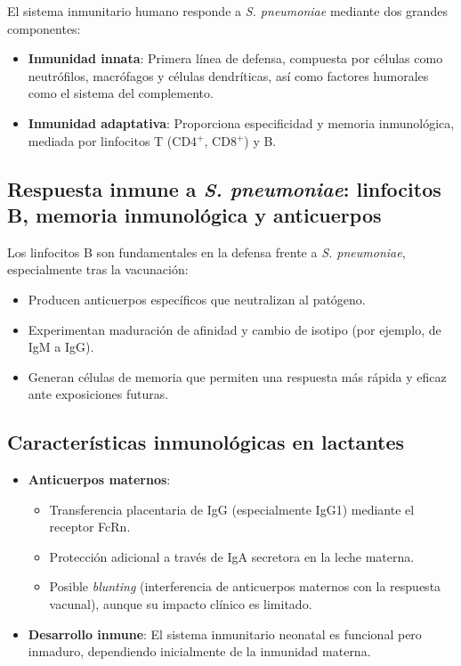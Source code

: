 El sistema inmunitario humano responde a \textit{S. pneumoniae} mediante dos grandes componentes:

\begin{itemize}
    \item \textbf{Inmunidad innata}: Primera línea de defensa, compuesta por células como neutrófilos, macrófagos y células dendríticas, así como factores humorales como el sistema del complemento.
    \item \textbf{Inmunidad adaptativa}: Proporciona especificidad y memoria inmunológica, mediada por linfocitos T (CD4$^+$, CD8$^+$) y B.
\end{itemize}

\subsection{Respuesta inmune a \textit{S. pneumoniae}: linfocitos B, memoria inmunológica y anticuerpos}

Los linfocitos B son fundamentales en la defensa frente a \textit{S. pneumoniae}, especialmente tras la vacunación:
\begin{itemize}
    \item Producen anticuerpos específicos que neutralizan al patógeno.
    \item Experimentan maduración de afinidad y cambio de isotipo (por ejemplo, de IgM a IgG).
    \item Generan células de memoria que permiten una respuesta más rápida y eficaz ante exposiciones futuras.
\end{itemize}

\subsection{Características inmunológicas en lactantes}
\begin{itemize}
    \item \textbf{Anticuerpos maternos}: 
    \begin{itemize}
        \item Transferencia placentaria de IgG (especialmente IgG1) mediante el receptor FcRn.
        \item Protección adicional a través de IgA secretora en la leche materna.
        \item Posible \textit{blunting} (interferencia de anticuerpos maternos con la respuesta vacunal), aunque su impacto clínico es limitado.\cite{AEP2023Blunting}
    \end{itemize}
    \item \textbf{Desarrollo inmune}: El sistema inmunitario neonatal es funcional pero inmaduro, dependiendo inicialmente de la inmunidad materna.
\end{itemize}

